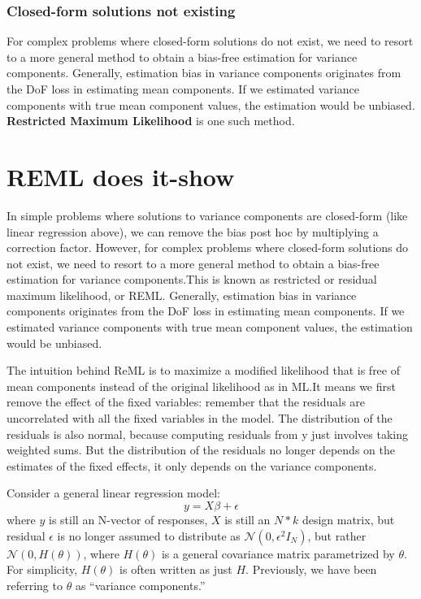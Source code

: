 \documentclass[a4paper,11pt]{article}
\begin{document}
\subsubsection{Closed-form solutions not existing}
    For complex problems where closed-form solutions do not exist, we
need to resort to a more general method to obtain a bias-free estimation for variance components. Generally, estimation bias in variance components originates from the DoF loss in estimating mean components. If we estimated variance components with true mean component values, the estimation would be unbiased. \textbf{Restricted Maximum Likelihood} is one such method.
\section{REML does it-show}

In simple problems where solutions to variance components are closed-form (like linear regression above), we can remove the bias post hoc by multiplying a correction factor. However, for complex problems where closed-form solutions do not exist, we need to resort to a more general method to obtain a bias-free estimation for variance components.This is known as restricted or residual maximum likelihood, or REML. Generally, estimation bias in variance components originates from the DoF loss in estimating mean components. If we estimated variance components with true mean component values, the estimation would be unbiased. 

The intuition behind ReML is to maximize a modified likelihood that is free of mean components instead of the original likelihood as in ML.It means we first remove the effect of the fixed variables: remember that the residuals are uncorrelated with all the fixed variables in the model. The distribution of the residuals is also normal, because computing residuals from y just involves taking weighted sums. But the distribution of the residuals no longer depends on the estimates of the fixed effects, it only depends on the variance components.

Consider a general linear regression model:
\begin{equation}\label{eq:0} 
         y= X\beta + \epsilon
\end{equation}
where $y$ is still an N-vector of responses, $X$ is still an $N*k$ design matrix, but residual $\epsilon$ is no longer assumed to distribute as $\mathcal{N}(0,\epsilon^2I_N)$, but rather $\mathcal{N} (0, H(\theta))$, where $H(\theta)$ is a general covariance matrix parametrized by $\theta$. For simplicity, $H(\theta)$ is often written as just $H$. Previously, we have been referring to $\theta$ as “variance components.”
\end{document}
